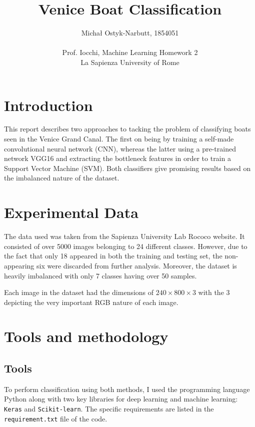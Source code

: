 \documentclass[12pt,a4paper]{article}
\begin{document}
\title{Venice Boat Classification}
\author{Michał Ostyk-Narbutt, 1854051 \\ \\ Prof. Iocchi, Machine Learning Homework 2 \\  La Sapienza University of Rome}

\maketitle
\tableofcontents
\clearpage
\section{Introduction}

This report describes two approaches to tacking the problem of classifying boats seen in the Venice Grand Canal. The first on being by training a self-made convolutional neural network (CNN), whereas the latter using a pre-trained network VGG16 and extracting the bottleneck features in order to train a Support Vector Machine (SVM). Both classifiers give promising results based on the imbalanced nature of the dataset.
\section{Experimental Data}
The data used was taken from the Sapienza University Lab Rococo website. It consisted of over 5000 images belonging to 24 different classes. However, due to the fact that only 18 appeared in both the training and testing set, the non-appearing six were discarded from further analysis. Moreover, the dataset is heavily imbalanced with only 7 classes having over 50 samples.

Each image in the dataset had the dimensions of $ 240 \times 800 \times 3$ with the $3$ depicting the very important RGB nature of each image.
\section{Tools and methodology}
\subsection{Tools}
To perform classification using both methods, I used the programming language Python along with two key libraries for deep learning and machine learning: \texttt{Keras} and \texttt{Scikit-learn}. The specific requirements are listed in the \texttt{requirement.txt} file  of the code.
\end{document}
